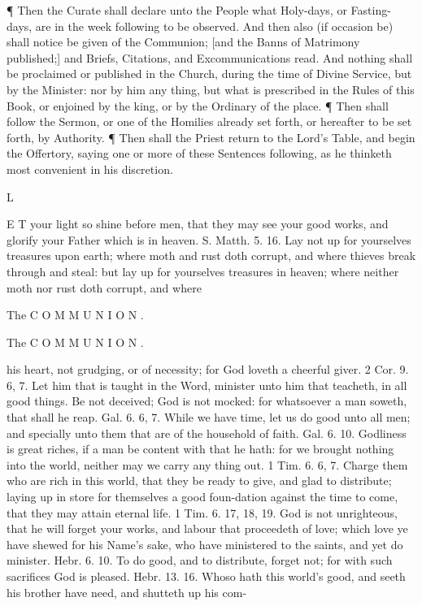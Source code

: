 ¶ Then the Curate shall declare unto the People what Holy-days, or Fasting-days, are in the week following to be observed. And then also (if occasion be) shall notice be given of the Communion; [and the Banns of Matrimony published;] and Briefs, Citations, and Excommunications read. And nothing shall be proclaimed or published in the Church, during the time of Divine Service, but by the Minister: nor by him any thing, but what is prescribed in the Rules of this Book, or enjoined by the king, or by the Ordinary of the place. ¶ Then shall follow the Sermon, or one of the Homilies already set forth, or hereafter to be set forth, by Authority. ¶ Then shall the Priest return to the Lord’s Table, and begin the Offertory, saying one or more of these Sentences following, as he thinketh most convenient in his discretion.

L

E T your light so shine before men, that they may see your good works, and glorify your Father which is in heaven. S. Matth. 5. 16. Lay not up for yourselves treasures upon earth; where moth and rust doth corrupt, and where thieves break through and steal: but lay up for yourselves treasures in heaven; where neither moth nor rust doth corrupt, and where

The C O M M U N I O N .

The C O M M U N I O N .

his heart, not grudging, or of necessity; for God loveth a cheerful giver. 2 Cor. 9. 6, 7. Let him that is taught in the Word, minister unto him that teacheth, in all good things. Be not deceived; God is not mocked: for whatsoever a man soweth, that shall he reap. Gal. 6. 6, 7. While we have time, let us do good unto all men; and specially unto them that are of the household of faith. Gal. 6. 10. Godliness is great riches, if a man be content with that he hath: for we brought nothing into the world, neither may we carry any thing out. 1 Tim. 6. 6, 7. Charge them who are rich in this world, that they be ready to give, and glad to distribute; laying up in store for themselves a good foun-dation against the time to come, that they may attain eternal life. 1 Tim. 6. 17, 18, 19. God is not unrighteous, that he will forget your works, and labour that proceedeth of love; which love ye have shewed for his Name’s sake, who have ministered to the saints, and yet do minister. Hebr. 6. 10. To do good, and to distribute, forget not; for with such sacrifices God is pleased. Hebr. 13. 16. Whoso hath this world’s good, and seeth his brother have need, and shutteth up his com-

